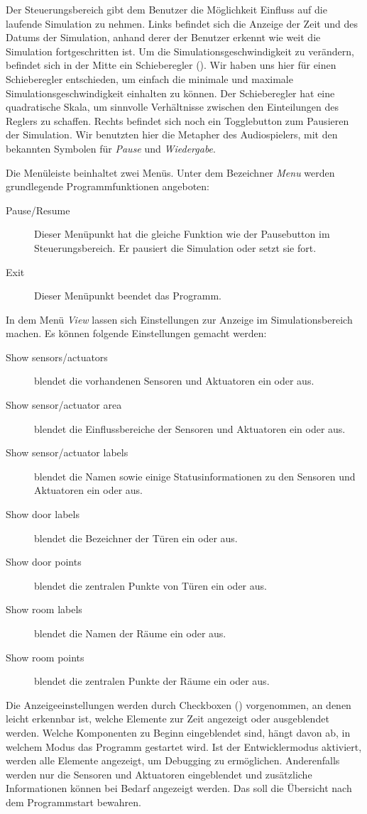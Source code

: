 Der Steuerungsbereich gibt dem Benutzer die Möglichkeit Einfluss auf die laufende Simulation zu nehmen. Links befindet sich die Anzeige der Zeit und des Datums der Simulation, anhand derer der Benutzer erkennt wie weit die Simulation fortgeschritten ist. Um die Simulationsgeschwindigkeit zu verändern, befindet sich in der Mitte ein Schieberegler (). Wir haben uns hier für einen Schieberegler entschieden, um einfach die minimale und maximale Simulationsgeschwindigkeit einhalten zu können. Der Schieberegler hat eine quadratische Skala, um sinnvolle Verhältnisse zwischen den Einteilungen des Reglers zu schaffen. Rechts befindet sich noch ein Togglebutton zum Pausieren der Simulation. Wir benutzten hier die Metapher des Audiospielers, mit den bekannten Symbolen für \emph{Pause} und \emph{Wiedergabe}.

Die Menüleiste beinhaltet zwei Menüs. Unter dem Bezeichner \emph{Menu} werden grundlegende Programmfunktionen angeboten:
\begin{description}

\item[Pause/Resume] Dieser Menüpunkt hat die gleiche Funktion wie der Pausebutton im Steuerungsbereich. Er pausiert die Simulation oder setzt sie fort.

\item[Exit] Dieser Menüpunkt beendet das Programm.
\end{description}

In dem Menü \emph{View} lassen sich Einstellungen zur Anzeige im Simulationsbereich machen. Es können folgende Einstellungen gemacht werden:
\begin{description}
\item[Show sensors/actuators] blendet die vorhandenen Sensoren und Aktuatoren ein oder aus.
\item[Show sensor/actuator area] blendet die Einflussbereiche der Sensoren und Aktuatoren ein oder aus.
\item[Show sensor/actuator labels] blendet die Namen sowie einige Statusinformationen zu den Sensoren und Aktuatoren ein oder aus.
\item[Show door labels] blendet die Bezeichner der Türen ein oder aus.
\item[Show door points] blendet die zentralen Punkte von Türen ein oder aus.
\item[Show room labels] blendet die Namen der Räume ein oder aus.
\item[Show room points] blendet die zentralen Punkte der Räume ein oder aus.
\end{description}
Die Anzeigeeinstellungen werden durch Checkboxen () vorgenommen, an denen leicht erkennbar ist, welche Elemente zur Zeit angezeigt oder ausgeblendet werden. Welche Komponenten zu Beginn eingeblendet sind, hängt davon ab, in welchem Modus das Programm gestartet wird. Ist der Entwicklermodus aktiviert, werden alle Elemente angezeigt, um Debugging zu ermöglichen. Anderenfalls werden nur die Sensoren und Aktuatoren eingeblendet und zusätzliche Informationen können bei Bedarf angezeigt werden. Das soll die Übersicht nach dem Programmstart bewahren. 

